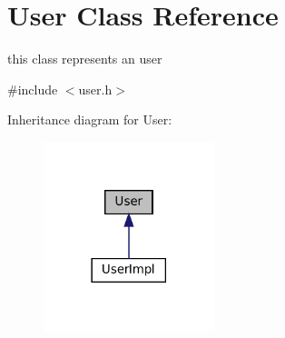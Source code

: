 \hypertarget{classUser}{}\section{User Class Reference}
\label{classUser}


this class represents an user  




{\ttfamily \#include $<$user.\+h$>$}



Inheritance diagram for User\+:
\nopagebreak
\begin{figure}[H]
\begin{center}
\leavevmode
\includegraphics[width=141pt]{classUser__inherit__graph}
\end{center}
\end{figure}
